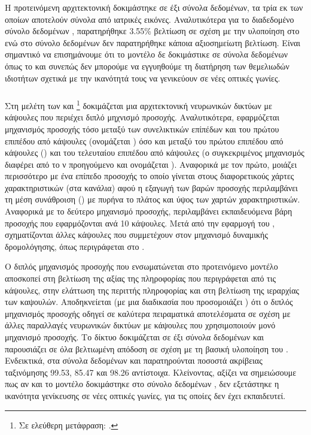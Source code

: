 Η προτεινόμενη αρχιτεκτονική δοκιμάστηκε σε έξι σύνολα δεδομένων, τα τρία εκ των οποίων αποτελούν σύνολα από ιατρικές εικόνες. Αναλυτικότερα για το διαδεδομένο σύνολο δεδομένων , παρατηρήθηκε 3.55\% βελτίωση σε σχέση με την υλοποίηση στο \cite{sabour2017dynamic} ενώ στο σύνολο δεδομένων  δεν παρατηρήθηκε κάποια αξιοσημείωτη βελτίωση. Είναι σημαντικό να επισημάνουμε ότι το μοντέλο δε δοκιμάστικε σε σύνολα δεδομένων όπως το  και συνεπώς δεν μπορούμε να εγγυηθούμε τη διατήρηση των θεμελιωδών ιδιοτήτων σχετικά με την ικανότητά τους να γενικεύουν σε νέες οπτικές γωνίες.

\subsubsection{}

Στη μελέτη των  και  \footnote{Σε ελεύθερη μετάφραση: .} \cite{huang2020capsnet} δοκιμάζεται μια αρχιτεκτονική νευρωνικών δικτύων με κάψουλες που περιέχει διπλό μηχνισμό προσοχής. Αναλυτικότερα, εφαρμόζεται μηχανισμός προσοχής τόσο μεταξύ των συνελικτικών επίπέδων και του πρώτου επιπέδου από κάψουλες (ονομάζεται ) όσο και μεταξύ του πρώτου επιπέδου από κάψουλες () και του τελευταίου επιπέδου από κάψουλες (ο συγκεκριμένος μηχανισμός διαφέρει από το ν προηγούμενο και ονομάζεται ). Αναφορικά με τον πρώτο, μοιάζει περισσότερο με ένα επίπεδο προσοχής το οποίο γίνεται στους διαφορετικούς χάρτες χαρακτηριστικών (στα κανάλια) αφού η εξαγωγή των βαρών προσοχής περιλαμβάνει τη μέση συνάθροιση () με πυρήνα το πλάτος και ύψος των χαρτών χαρακτηριστικών. Αναφορικά με το δεύτερο μηχανισμό προσοχής, περιλαμβάνει εκπαιδευόμενα βάρη προσοχής που εφαρμόζονται ανά 10 κάψουλες. Μετά από την εφαρμογή του , σχηματίζονται άλλες κάψουλες που συμμετέχουν στον μηχανισμό δυναμικής δρομολόγησης, όπως περιγράφεται στο \cite{sabour2017dynamic}.\par

Ο διπλός μηχανισμός προσοχής που ενσωματώνεται στο προτεινόμενο μοντέλο αποσκοπεί στη βελτίωση της αξίας της πληροφορίας που περιγράφεται από τις κάψουλες, στην ελάττωση της περιττής πληροφορίας και στη βελτίωση της ιεραρχίας των καψουλών. Αποδηκνείεται (με μια διαδικασία που προσομοιάζει ) ότι ο διπλός μηχανισμός προσοχής οδηγεί σε καλύτερα πειραματικά αποτελέσματα σε σχέση με άλλες παραλλαγές νευρωνικών δικτύων με κάψουλες που χρησιμοποιούν μονό μηχανισμό προσοχής. Το δίκτυο δοκιμάζεται σε έξι σύνολα δεδομένων και παρουσιάζει σε όλα βελτιωμένη απόδοση σε σχέση με τη βασική υλοποίηση του \cite{sabour2017dynamic}. Ενδεικτικά, στα σύνολα δεδομένων  και  παρατηρούνται ποσοστά ακρίβειας ταξινόμησης 99.53, 85.47 και 98.26 αντίστοιχα. Κλείνοντας, αξίζει να σημειώσουμε πως αν και το μοντέλο δοκιμάστηκε στο σύνολο δεδομένων , δεν εξετάστηκε η ικανότητα γενίκευσης σε νέες οπτικές γωνίες, για τις οποίες δεν έχει εκπαιδευτεί.

